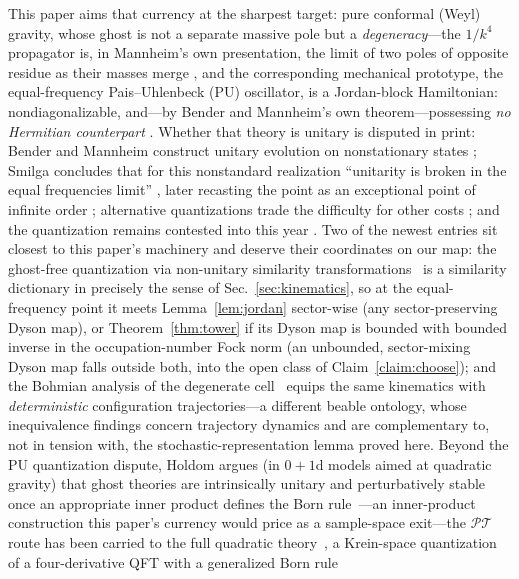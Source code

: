 \documentclass[11pt]{article}
\theoremstyle{definition}
\theoremstyle{remark}
\newcommand{\PT}{\mathcal{PT}}
\begin{document}
This paper aims that currency at the sharpest target: pure conformal
(Weyl) gravity, whose ghost is not a separate massive pole but a
\emph{degeneracy}---the $1/k^{4}$ propagator is, in Mannheim's own
presentation, the limit of two poles of opposite residue as their
masses merge \cite{Mannheim2011}, and the corresponding mechanical
prototype, the equal-frequency Pais--Uhlenbeck (PU) oscillator, is a
Jordan-block Hamiltonian: nondiagonalizable, and---by
Bender and Mannheim's own theorem---possessing \emph{no Hermitian
counterpart} \cite{BenderMannheim2008PRD}. Whether that theory is
unitary is disputed in print: Bender and Mannheim construct unitary
evolution on nonstationary states \cite{BenderMannheim2008PRD};
Smilga concludes that for this nonstandard realization ``unitarity
is broken in the equal frequencies limit'' \cite{Smilga2008}, later
recasting the point as an exceptional point of infinite order
\cite{Smilga2014}; alternative quantizations trade the difficulty
for other costs \cite{Mostafazadeh2011,IlhanKovner2014}; and the
quantization remains contested into this year
\cite{FMT2026,FringTairaTurner2025,FelskiFringTurner2025,DeyFring2026}. Two of the
newest entries sit closest to this paper's machinery and deserve
their coordinates on our map: the ghost-free quantization via
non-unitary similarity transformations~\cite{FringTairaTurner2025}
is a similarity dictionary in precisely the sense of
Sec.~\ref{sec:kinematics}, so at the equal-frequency point it
meets Lemma~\ref{lem:jordan} sector-wise (any sector-preserving Dyson
map), or Theorem~\ref{thm:tower} if its Dyson map is bounded with bounded
inverse in the occupation-number Fock norm (an unbounded, sector-mixing
Dyson map falls outside both, into the open class of
Claim~\ref{claim:choose}); and the Bohmian
analysis of the degenerate cell~\cite{DeyFring2026} equips the
same kinematics with \emph{deterministic} configuration
trajectories---a different beable ontology, whose inequivalence
findings concern trajectory dynamics and are complementary to,
not in tension with, the stochastic-representation lemma proved
here. Beyond the PU quantization dispute, Holdom argues (in $0{+}1$d
models aimed at quadratic gravity) that ghost theories are
intrinsically unitary and perturbatively stable once an appropriate inner product
defines the Born rule~\cite{Holdom2024}---an inner-product
construction this paper's currency would price as a sample-space
exit---the $\PT$ route has been carried to
the full quadratic theory~\cite{Kuntz2024}, a Krein-space
quantization of a four-derivative QFT with a generalized Born rule
\end{document}
